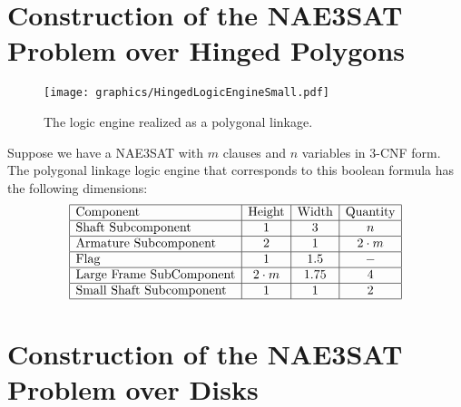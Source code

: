 \section{Construction of the NAE3SAT Problem over Hinged Polygons}         
\begin{figure}[!htbp]
\begin{center}
\texttt{[image: graphics/HingedLogicEngineSmall.pdf]}
\caption{The logic engine realized as a polygonal linkage.}\label{fig:HingedLogicEngineSmall.pdf}
\end{center}
\end{figure}
Suppose we have a NAE3SAT with $m$ clauses and $n$ variables in 3-CNF form.  The polygonal linkage logic engine that corresponds to this boolean formula has the following dimensions:
$$\begin{array}{|l|c|c|c|}
 \hline
 \text{Component} & \text{Height} & \text{Width} & \text{Quantity}\\\hline
 \text{Shaft Subcomponent} & 1 & 3 & n\\\hline
 \text{Armature Subcomponent} & 2 & 1 & 2\cdot m\\\hline
 \text{Flag} & 1 & 1.5 & -\\\hline
 \text{Large Frame SubComponent} & 2\cdot m & 1.75 & 4\\\hline
 \text{Small Shaft Subcomponent} & 1 & 1 & 2\\\hline
\end{array}$$


\section{Construction of the NAE3SAT Problem over Disks}
